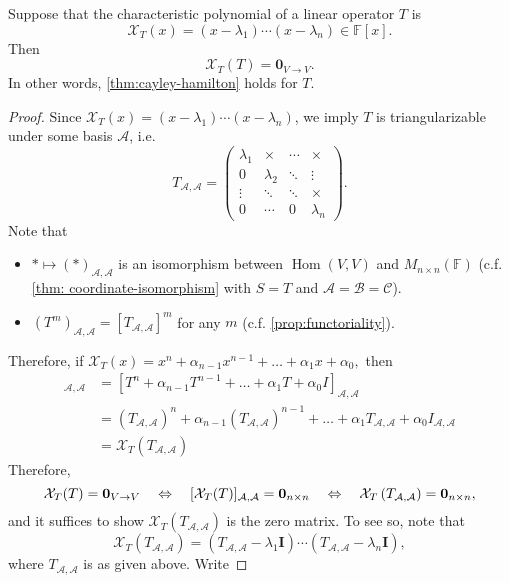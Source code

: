\begin{proposition}\label{prop:cayley-hamilton-diagonalizable}
Suppose that the characteristic polynomial of a linear operator \( T \) is
\[
\mathcal{X}_{T}(x) = (x - \lambda_1)\cdots(x - \lambda_n) \in \mathbb{F}[x].
\]
Then
\[
\mathcal{X}_{T}(T) = \mathbf{0}_{V \to V}.
\]
In other words, \autoref{thm:cayley-hamilton} holds for $T$.
\end{proposition}


\begin{proof}
Since ${\mathcal{X}}_{T}(x) = (x - \lambda_1) \cdots (x - \lambda_n)$, we imply $T$ is triangularizable under some basis $\mathcal{A}$, i.e.
$$T_{\mathcal{A},\mathcal{A}} = \begin{pmatrix}
\lambda_1 & \times & \cdots & \times \\
0 & \lambda_2 & \ddots & \vdots \\
\vdots & \ddots & \ddots & \times \\
0 & \cdots & 0 & \lambda_n
\end{pmatrix}.$$
Note that
\begin{itemize}
\item $\ast \mapsto {\left( \ast \right)}_{\mathcal{A},\mathcal{A}}$ is an isomorphism between $\operatorname{Hom}(V,V)$ and ${M}_{n \times n}(\mathbb{F})$ (c.f. \autoref{thm: coordinate-isomorphism} with $S = T$ and $\mathcal{A} = \mathcal{B} = \mathcal{C}$).
\item ${\left( T^m \right)}_{\mathcal{A},\mathcal{A}} = \left[ T_{\mathcal{A},\mathcal{A}} \right]^m$ for any $m$ (c.f. \autoref{prop:functoriality}).
\end{itemize}
Therefore, if
${\mathcal{X}}_{T}(x) = x^n + \alpha_{n-1}x^{n-1} + \dots + \alpha_1 x + \alpha_0,$ then
\begin{align*}
[{\mathcal{X}}_{T}(T)]_{\mathcal{A},\mathcal{A}} &= 
[T^n + \alpha_{n-1}T^{n-1} + \dots + \alpha_1 T + \alpha_0I]_{\mathcal{A},\mathcal{A}} \\
&= (T_{\mathcal{A},\mathcal{A}})^n + \alpha_{n-1}(T_{\mathcal{A},\mathcal{A}})^{n-1} + \dots + \alpha_1 T_{\mathcal{A},\mathcal{A}} + \alpha_0I_{\mathcal{A},\mathcal{A}} \\
&= {\mathcal{X}}_{T}\left( T_{\mathcal{A},\mathcal{A}}\right)
\end{align*}
Therefore,
$$\mathcal{X}_{T}(T) = \mathbf{0}_{V \to V} \quad \Leftrightarrow \quad [\mathcal{X}_{T}(T)]_{\mathcal{A},\mathcal{A}} = {\bf 0}_{n \times n} \quad \Leftrightarrow \quad {\mathcal{X}}_{T}\left( T_{\mathcal{A},\mathcal{A}}\right) = {\bf 0}_{n \times n},$$
and it suffices to show ${\mathcal{X}}_{T}\left( T_{\mathcal{A},\mathcal{A}}\right)$ is the zero matrix. To see so, note that
\[
{\mathcal{X}}_{T}\left( T_{\mathcal{A},\mathcal{A}} \right) = \left( T_{\mathcal{A},\mathcal{A}} - \lambda_1 \mathbf{I} \right) \cdots \left( T_{\mathcal{A},\mathcal{A}} - \lambda_n \mathbf{I} \right),
\]
where $T_{\mathcal{A},\mathcal{A}}$ is as given above. Write


\end{proof}
